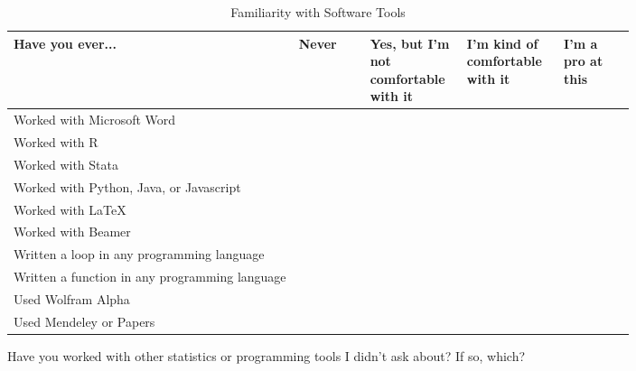 \documentclass[12pt]{article}
\begin{document}
\begin{landscape}
\begin{table}[h!]
    \centering
    \small
    \caption{Familiarity with Software Tools}\label{}
    \begin{tabular}{p{0.4\linewidth}|p{0.1\linewidth}|p{0.1\linewidth}|p{0.1\linewidth}|p{0.1\linewidth}|}
    Have you ever...                               & Never & Yes, but I'm not comfortable with it & I'm kind of comfortable with it & I'm a pro at this \\
    \hline
    Worked with Microsoft Word                     &       &                                      &                                    &                   \\
    \hline
    Worked with R                                  &       &                                      &                                    &                   \\
    \hline
    Worked with Stata                              &       &                                      &                                    &                   \\
    \hline
    Worked with Python, Java, or Javascript                             &       &                                      &                                    &                   \\
    \hline
    Worked with \LaTeX                             &       &                                      &                                    &                   \\
    \hline
    Worked with Beamer                             &       &                                      &                                    &                   \\
    \hline
    Written a loop in any programming language     &       &                                      &                                    &                   \\
    \hline
    Written a function in any programming language &       &                                      &                                    &                   \\
    \hline Used Wolfram Alpha                 &       &                                      &                                    &                   \\
    \hline Used Mendeley or Papers                 &       &                                      &                                    & \\
    \hline
    \end{tabular}
    \end{table}
Have you worked with other statistics or programming tools I didn't ask about? If so, which?
\vspace{1cm}
\hrulefill\\


\end{landscape}
\end{document}
